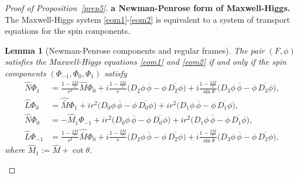 \documentclass[11pt]{article}
\numberwithin{equation}{section}
\theoremstyle{plain}
\newtheorem{lemma}[theorem]{Lemma}
\theoremstyle{definition}
\theoremstyle{remark}
\begin{document}
\begin{proof}[Proof of Proposition~\ref{prep5}]
\medskip
\noindent\textbf{a Newman-Penrose form of Maxwell-Higgs.}
The Maxwell-Higgs system \eqref{eom1}-\eqref{eom2} is equivalent to a system of transport equations for the spin components.

\begin{lemma}[Newman-Penrose components and regular frames]\label{lem:app5-NP}
The pair $(F,\phi)$ satisfies the Maxwell-Higgs equations \eqref{eom1} and \eqref{eom2} if and only if the spin components $(\Phi_{-1},\Phi_{0},\Phi_{1})$ satisfy
\begin{eqnarray}
\label{maxcom1}
\hat N\Phi_{1}
&=
\frac{1-\frac{2M}{r}}{r^{2}}\hat M\Phi_{0}
+i\frac{1-\frac{2M}{r}}{r}\bigl(D_{2}\phi\,\overline{\phi}-\phi\,\overline{D_{2}\phi}\bigr)
+i\frac{1-\frac{2M}{r}}{\sin\theta}\bigl(D_{3}\phi\,\overline{\phi}-\phi\,\overline{D_{3}\phi}\bigr),
\\
\label{maxcom2}
\hat L\Phi_{0}
&=
\hat{\bar M}\Phi_{1}
+ir^{2}\bigl(D_{0}\phi\,\overline{\phi}-\phi\,\overline{D_{0}\phi}\bigr)
+ir^{2}\bigl(D_{1}\phi\,\overline{\phi}-\phi\,\overline{D_{1}\phi}\bigr),
\\
\label{maxcom3}
\hat N\Phi_{0}
&=
-\hat M_{1}\Phi_{-1}
+ir^{2}\bigl(D_{0}\phi\,\overline{\phi}-\phi\,\overline{D_{0}\phi}\bigr)
+ir^{2}\bigl(D_{1}\phi\,\overline{\phi}-\phi\,\overline{D_{1}\phi}\bigr),
\\
\label{maxcom4}
\hat L\Phi_{-1}
&=
\frac{1-\frac{2M}{r}}{r^{2}}\hat{\bar M}\Phi_{0}
+i\frac{1-\frac{2M}{r}}{r}\bigl(D_{2}\phi\,\overline{\phi}-\phi\,\overline{D_{2}\phi}\bigr)
+i\frac{1-\frac{2M}{r}}{\sin\theta}\bigl(D_{3}\phi\,\overline{\phi}-\phi\,\overline{D_{3}\phi}\bigr),
\end{eqnarray}
where $\hat M_{1}:=\hat M+\cot\theta$.
\end{lemma}


\end{proof}
\end{document}
